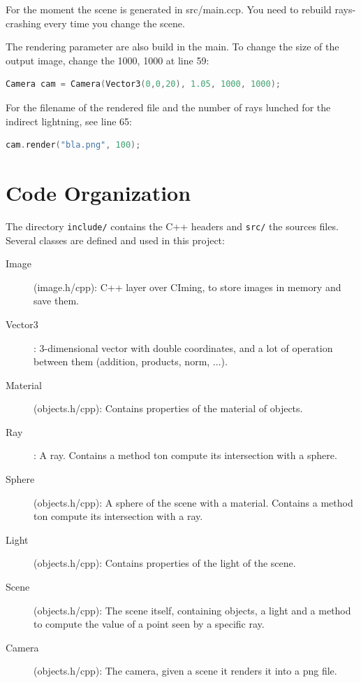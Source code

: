 \documentclass[11pt]{article}
\begin{document}
For the moment the scene is generated in src/main.ccp. You need to rebuild rays-crashing every time you change the scene.

The rendering parameter are also build in the main. To change the size of the output image, change the 1000, 1000 at line 59:
\begin{center}
	\begin{lstlisting}[language=c++]
	Camera cam = Camera(Vector3(0,0,20), 1.05, 1000, 1000);
	\end{lstlisting}
\end{center}
For the filename of the rendered file and the number of rays lunched for the indirect lightning, see line 65:
\begin{center}
	\begin{lstlisting}[language=c++]
	cam.render("bla.png", 100);
	\end{lstlisting}
\end{center}

\section{Code Organization}
The directory \texttt{include/} contains the C++ headers and \texttt{src/} the sources files. Several classes are defined and used in this project:
\begin{description}
  \item[Image] (image.h/cpp): C++ layer over CIming, to store images in memory and save them.
  \item[Vector3] : 3-dimensional vector with double coordinates, and a lot of operation between them (addition, products, norm, ...).
  \item[Material] (objects.h/cpp): Contains properties of the material of objects.
  \item[Ray] : A ray. Contains a method ton compute its intersection with a sphere.
  \item[Sphere] (objects.h/cpp): A sphere of the scene with a material. Contains a method ton compute its intersection with a ray.
  \item[Light] (objects.h/cpp): Contains properties of the light of the scene.
  \item[Scene] (objects.h/cpp): The scene itself, containing objects, a light and a method to compute the value of a point seen by a specific ray.
  \item[Camera] (objects.h/cpp): The camera, given a scene it renders it into a png file.
\end{description}
\end{document}
